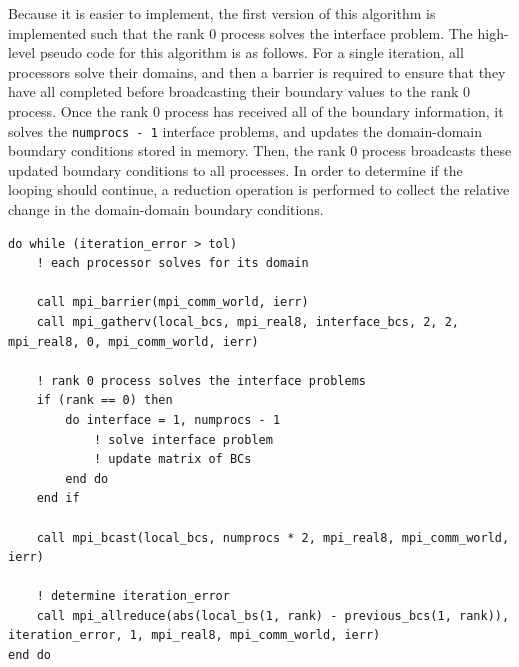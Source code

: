 \documentclass[10pt]{article}
\begin{document}
Because it is easier to implement, the first version of this algorithm is implemented such that the rank 0 process solves the interface problem. The high-level pseudo code for this algorithm is as follows. For a single iteration, all processors solve their domains, and then a barrier is required to ensure that they have all completed before broadcasting their boundary values to the rank 0 process. Once the rank 0 process has received all of the boundary information, it solves the {\tt numprocs - 1} interface problems, and updates the domain-domain boundary conditions stored in memory. Then, the rank 0 process broadcasts these updated boundary conditions to all processes. In order to determine if the looping should continue, a reduction operation is performed to collect the relative change in the domain-domain boundary conditions.

\begin{lstlisting}
do while (iteration_error > tol)
	! each processor solves for its domain

	call mpi_barrier(mpi_comm_world, ierr)
	call mpi_gatherv(local_bcs, mpi_real8, interface_bcs, 2, 2, mpi_real8, 0, mpi_comm_world, ierr)
	
	! rank 0 process solves the interface problems
	if (rank == 0) then
		do interface = 1, numprocs - 1
			! solve interface problem
			! update matrix of BCs
		end do
	end if
	
	call mpi_bcast(local_bcs, numprocs * 2, mpi_real8, mpi_comm_world, ierr)
	
	! determine iteration_error
	call mpi_allreduce(abs(local_bs(1, rank) - previous_bcs(1, rank)), iteration_error, 1, mpi_real8, mpi_comm_world, ierr)
end do
\end{lstlisting}
\end{document}
